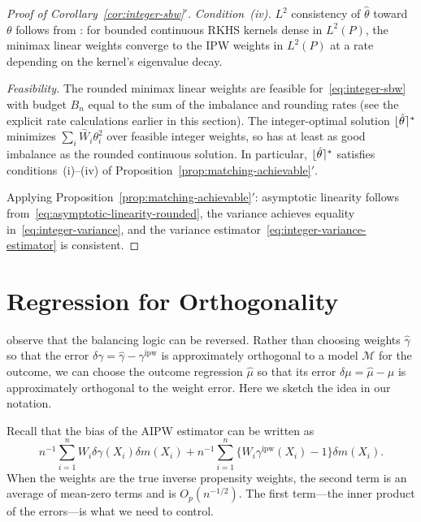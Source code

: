 \documentclass{article}
\newcommand{\paragraph}[1]{\par\noindent\textit{#1}\enspace}
\theoremstyle{definition}
\DeclarePairedDelimiter\round{\lfloor}{\rceil}
\newcommand{\model}{\mathcal{M}}
\newcommand{\<}{\langle}
\renewcommand{\>}{\rangle}
\begin{document}
\begin{refsection}
\begin{proof}[Proof of Corollary~\ref{cor:integer-sbw}$'$]
\paragraph{Condition~(iv).}
$L^2$ consistency of $\hat\theta$ toward $\theta$ follows from \citet[Theorem 1]{hirshberg2019minimax}: for bounded continuous RKHS kernels dense in $L^2(P)$, the minimax linear weights converge to the IPW weights in $L^2(P)$ at a rate depending on the kernel's eigenvalue decay.

\paragraph{Feasibility.}
The rounded minimax linear weights are feasible for~\eqref{eq:integer-sbw} with budget $B_n$ equal to the sum of the imbalance and rounding rates (see the explicit rate calculations earlier in this section). The integer-optimal solution $\round{\hat\theta}^*$ minimizes $\sum_i \overset{\neg}{W}_i \theta_i^2$ over feasible integer weights, so has at least as good imbalance as the rounded continuous solution. In particular, $\round{\hat\theta}^*$ satisfies conditions~(i)--(iv) of Proposition~\ref{prop:matching-achievable}$'$.

Applying Proposition~\ref{prop:matching-achievable}$'$: asymptotic linearity follows from~\eqref{eq:asymptotic-linearity-rounded}, the variance achieves equality in~\eqref{eq:integer-variance}, and the variance estimator~\eqref{eq:integer-variance-estimator} is consistent.
\end{proof}


\section{Regression for Orthogonality}
\label{app:regression-orthogonality}

\citet{wang2020debiased} observe that the balancing logic can be reversed. Rather than choosing weights $\hat\gamma$ so that the error $\delta\gamma = \hat\gamma - \gamma^{\text{ipw}}$ is approximately orthogonal to a model $\model$ for the outcome, we can choose the outcome regression $\hat \mu$ so that its error $\delta \mu = \hat \mu - \mu$ is approximately orthogonal to the weight error. Here we sketch the idea in our notation.

Recall that the bias of the AIPW estimator can be written as
\begin{equation}
n^{-1} \sum_{i=1}^n W_i \delta\gamma(X_i) \delta m(X_i) + n^{-1} \sum_{i=1}^n \{W_i \gamma^{\text{ipw}}(X_i) - 1\} \delta m(X_i).
\end{equation}
When the weights are the true inverse propensity weights, the second term is an average of mean-zero terms and is $O_p(n^{-1/2})$. The first term---the inner product of the errors---is what we need to control.


\end{refsection}
\end{document}
